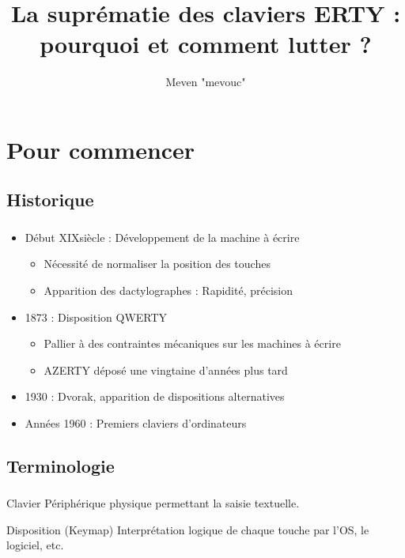 \documentclass[c,12pt]{beamer}
\title{La suprématie des claviers ERTY : pourquoi et comment lutter ?}
\author{Meven "mevouc" \bsc{Courouble}}
\date{\oldstylenums{3 décembre 2015}}
\begin{document}
\frame{\titlepage}

\section{Pour commencer}
\subsection{Historique}

\begin{frame}
	\frametitle{\subsecname}
	\begin{itemize}
		\item<1-> Début XIX\ieme siècle : Développement de la machine à écrire
			\begin{itemize}
				\item<2-> Nécessité de normaliser la position des touches
				\item<3-> Apparition des dactylographes : Rapidité, précision
			\end{itemize}
		\item<4-> 1873 : Disposition QWERTY
			\begin{itemize}
				\item<5-> Pallier à des contraintes mécaniques sur les machines à écrire
				\item<6-> AZERTY déposé une vingtaine d'années plus tard
			\end{itemize}
		\item<7-> 1930 : Dvorak, apparition de dispositions alternatives
		\item Années 1960 : Premiers claviers d'ordinateurs
	\end{itemize}
\end{frame}

\subsection{Terminologie}

\begin{frame}
	\frametitle{\subsecname}
	\begin{block}{Clavier}
		Périphérique physique permettant la saisie textuelle.
	\end{block}
	\begin{block}{Disposition (Keymap)}
		Interprétation logique de chaque touche par l'OS, le logiciel, etc.
	\end{block}
\end{frame}
\end{document}
